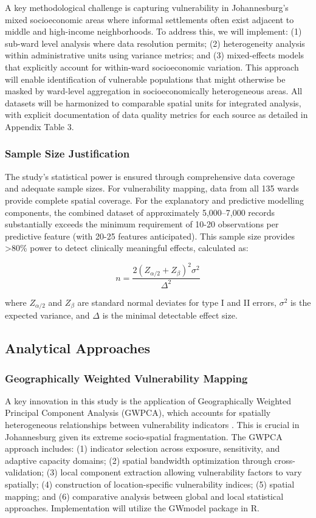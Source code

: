 A key methodological challenge is capturing vulnerability in Johannesburg's mixed socioeconomic areas where informal settlements often exist adjacent to middle and high-income neighborhoods. To address this, we will implement: (1) sub-ward level analysis where data resolution permits; (2) heterogeneity analysis within administrative units using variance metrics; and (3) mixed-effects models that explicitly account for within-ward socioeconomic variation. This approach will enable identification of vulnerable populations that might otherwise be masked by ward-level aggregation in socioeconomically heterogeneous areas. All datasets will be harmonized to comparable spatial units for integrated analysis, with explicit documentation of data quality metrics for each source as detailed in Appendix Table 3.

\subsubsection{Sample Size Justification}
The study's statistical power is ensured through comprehensive data coverage and adequate sample sizes. For vulnerability mapping, data from all 135 wards provide complete spatial coverage. For the explanatory and predictive modelling components, the combined dataset of approximately 5,000--7,000 records substantially exceeds the minimum requirement of 10-20 observations per predictive feature (with 20-25 features anticipated). This sample size provides >80\% power to detect clinically meaningful effects, calculated as:

\begin{equation}
n = \frac{2(Z_{\alpha/2} + Z_{\beta})^2\sigma^2}{\Delta^2}
\end{equation}

where $Z_{\alpha/2}$ and $Z_{\beta}$ are standard normal deviates for type I and II errors, $\sigma^2$ is the expected variance, and $\Delta$ is the minimal detectable effect size.

\subsection{Analytical Approaches}

\subsubsection{Geographically Weighted Vulnerability Mapping}\label{gwpca}
A key innovation in this study is the application of Geographically Weighted Principal Component Analysis (GWPCA), which accounts for spatially heterogeneous relationships between vulnerability indicators \citep{Quispe2023, Praharaj2024}. This is crucial in Johannesburg given its extreme socio-spatial fragmentation. The GWPCA approach includes: (1) indicator selection across exposure, sensitivity, and adaptive capacity domains; (2) spatial bandwidth optimization through cross-validation; (3) local component extraction allowing vulnerability factors to vary spatially; (4) construction of location-specific vulnerability indices; (5) spatial mapping; and (6) comparative analysis between global and local statistical approaches. Implementation will utilize the GWmodel package in R.

